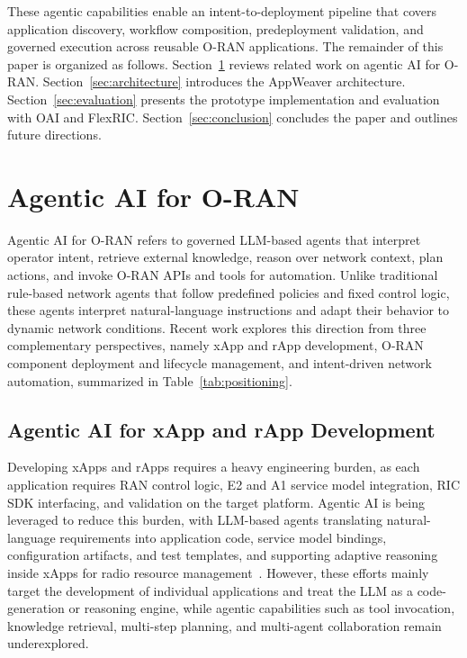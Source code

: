 \documentclass[conference]{IEEEtran}
\begin{document}
These agentic capabilities enable an intent-to-deployment pipeline that covers application discovery, workflow composition, predeployment validation, and governed execution across reusable O-RAN applications.
The remainder of this paper is organized as follows. Section~\ref{sec:background} reviews related work on agentic AI for O-RAN. Section~\ref{sec:architecture} introduces the AppWeaver architecture. Section~\ref{sec:evaluation} presents the prototype implementation and evaluation with OAI and FlexRIC. Section~\ref{sec:conclusion} concludes the paper and outlines future directions.

\section{Agentic AI for O-RAN}\label{sec:background}
Agentic AI for O-RAN refers to governed LLM-based agents that interpret operator intent, retrieve external knowledge, reason over network context, plan actions, and invoke O-RAN APIs and tools for automation. Unlike traditional rule-based network agents that follow predefined policies and fixed control logic, these agents interpret natural-language instructions and adapt their behavior to dynamic network conditions. Recent work explores this direction from three complementary perspectives, namely xApp and rApp development, O-RAN component deployment and lifecycle management, and intent-driven network automation, summarized in Table~\ref{tab:positioning}.


\subsection{Agentic AI for xApp and rApp Development}
Developing xApps and rApps requires a heavy engineering burden, as each application requires RAN control logic, E2 and A1 service model integration, RIC SDK interfacing, and validation on the target platform. Agentic AI is being leveraged to reduce this burden, with LLM-based agents translating natural-language requirements into application code, service model bindings, configuration artifacts, and test templates, and supporting adaptive reasoning inside xApps for radio resource management~\cite{maatouk2024large}. However, these efforts mainly target the development of individual applications and treat the LLM as a code-generation or reasoning engine, while agentic capabilities such as tool invocation, knowledge retrieval, multi-step planning, and multi-agent collaboration remain underexplored.
\end{document}
